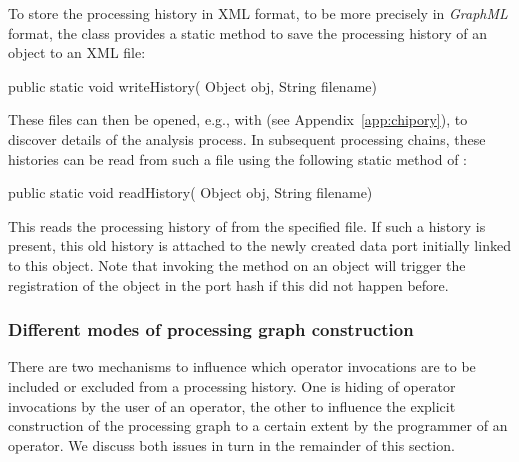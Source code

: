 
To store the processing history in XML format, to be more precisely in
{\em GraphML} format, the class 
provides a static method to save the processing history of
an object to an XML file:
\begin{code}
  public static void writeHistory( Object obj, String filename)
\end{code}
These files can then be opened,
e.g., with \chipory (see Appendix~\ref{app:chipory}), to discover details of the
analysis process.
In subsequent processing chains, these histories
can be 
read from such a file using the following static method of :
\begin{code}
  public static void readHistory( Object obj, String filename)
\end{code}
This reads the processing history of  from the specified file. If such a history 
is present, this old history is attached to the newly created data port initially linked to this
 object.
Note that invoking the  method on an object will trigger the
registration of the object in the port hash if this did not happen before.


\subsubsection{Different modes of processing graph construction}
\label{subsec:graphdetails}

There are two mechanisms to influence which operator invocations are to be included
or excluded from a processing history.
One is hiding of operator invocations by the user of an operator,
the other to influence the explicit construction of the processing graph
to a certain extent by the programmer of an operator.
We discuss both issues in turn in the remainder of this section.

